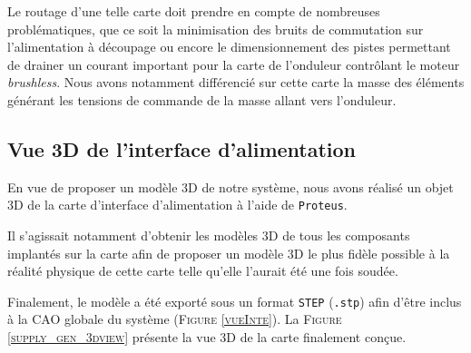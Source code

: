 		Le routage d'une telle carte doit prendre en compte de nombreuses
		problématiques, que ce soit la minimisation des bruits de commutation
		sur l'alimentation à découpage ou encore le dimensionnement des
		pistes permettant de drainer un courant important pour la
		carte de l'onduleur contrôlant le moteur \textit{brushless}. 
		Nous avons notamment différencié sur cette carte la masse des
		éléments générant les tensions de commande de la masse allant
		vers l'onduleur.
		
		\subsection{Vue 3D de l'interface d'alimentation}
		
		En vue de proposer un modèle 3D de notre système, nous
		avons réalisé un objet 3D de la carte d'interface d'alimentation
		à l'aide de \texttt{Proteus}.
		
		Il s'agissait notamment d'obtenir les modèles 3D de tous les
		composants implantés sur la carte afin de proposer un modèle
		3D le plus fidèle possible à la réalité physique de cette carte
		telle qu'elle l'aurait été une fois soudée.
		
		Finalement, le modèle a été exporté sous un format \texttt{STEP} 
		(\texttt{.stp}) afin d'être inclus à la CAO globale du système (\textsc{Figure \ref{vueInte}}).
		La \textsc{Figure \ref{supply_gen_3dview}} présente la vue 3D
		de la carte finalement conçue.
		
		\newpage
		
